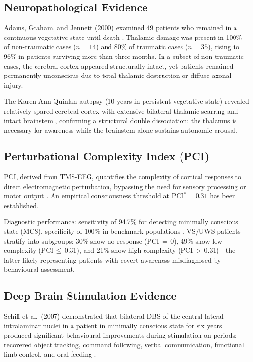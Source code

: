 \documentclass[10pt, a4paper, twocolumn]{article}
\begin{document}
\subsection{Neuropathological Evidence}

Adams, Graham, and Jennett (2000) examined 49 patients who remained in a
continuous vegetative state until death \cite{adams2000}. Thalamic
damage was present in 100\% of non-traumatic cases ($n=14$) and 80\% of
traumatic cases ($n=35$), rising to 96\% in patients surviving more than
three months. In a subset of non-traumatic cases, the cerebral cortex
appeared structurally intact, yet patients remained permanently
unconscious due to total thalamic destruction or diffuse axonal injury.

The Karen Ann Quinlan autopsy (10 years in persistent vegetative state)
revealed relatively spared cerebral cortex with extensive bilateral
thalamic scarring and intact brainstem \cite{quinlan1994}, confirming a
structural double dissociation: the thalamus is necessary for awareness
while the brainstem alone sustains autonomic arousal.

\subsection{Perturbational Complexity Index (PCI)}

PCI, derived from TMS-EEG, quantifies the complexity of cortical
responses to direct electromagnetic perturbation, bypassing the need for
sensory processing or motor output \cite{casali2013}. An empirical
consciousness threshold at PCI$^{*} = 0.31$ has been established.

Diagnostic performance: sensitivity of 94.7\% for detecting minimally
conscious state (MCS), specificity of 100\% in benchmark populations
\cite{casarotto2016}. VS/UWS patients stratify into subgroups: 30\%
show no response (PCI\,$=$\,0), 49\% show low complexity
(PCI\,$\leq$\,0.31), and 21\% show high complexity
(PCI\,$>$\,0.31)---the latter likely representing patients with covert
awareness misdiagnosed by behavioural assessment.

\subsection{Deep Brain Stimulation Evidence}

Schiff et al.\ (2007) demonstrated that bilateral DBS of the central
lateral intralaminar nuclei in a patient in minimally conscious state for
six years produced significant behavioural improvements during
stimulation-on periods: recovered object tracking, command following,
verbal communication, functional limb control, and oral feeding
\cite{schiff2007}.
\end{document}
